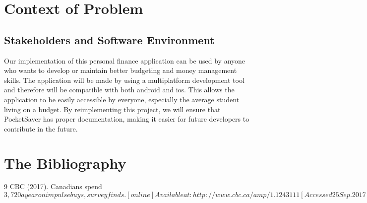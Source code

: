 \documentclass[12pt]{article}
\begin{document}
\section{Context of Problem}
\subsection{Stakeholders and Software Environment}
Our implementation of this personal finance application can be used by anyone who wants to develop or maintain better budgeting and money management skills. The application will be made by using a multiplatform development tool and therefore will be compatible with both android and ios. This allows the application to be easily accessible by everyone, especially the average student living on a budget. By reimplementing this project, we will ensure that PocketSaver has proper documentation, making it easier for future developers to contribute in the future.


\section{The Bibliography}{9}
CBC (2017). Canadians spend $3,720 a year on impulse buys, survey finds. [online] Available at: http://www.cbc.ca/amp/1.1243111 [Accessed 25 Sep. 2017].
$
\end{document}

